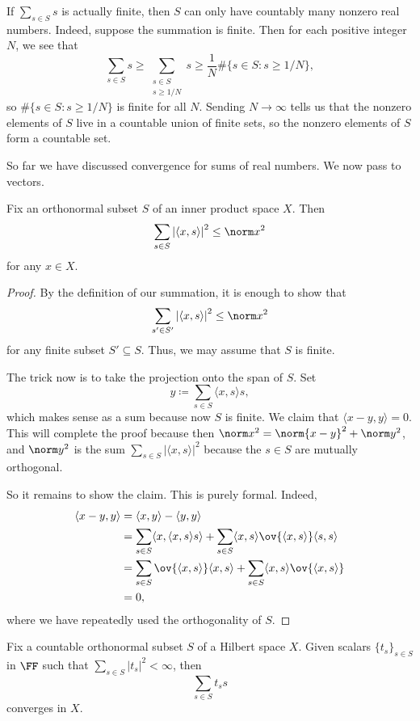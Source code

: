 \documentclass[../notes.tex]{subfiles}
\begin{document}
\begin{remark} \label{rem:converge-only-when-countable}
	If $\sum_{s\in S}s$ is actually finite, then $S$ can only have countably many nonzero real numbers. Indeed, suppose the summation is finite. Then for each positive integer $N$, we see that
	\[\sum_{s\in S}s\ge\sum_{\substack{s\in S\\s\ge1/N}}s\ge\frac1N\#\{s\in S:s\ge1/N\},\]
	so $\#\{s\in S:s\ge1/N\}$ is finite for all $N$. Sending $N\to\infty$ tells us that the nonzero elements of $S$ live in a countable union of finite sets, so the nonzero elements of $S$ form a countable set.
\end{remark}
So far we have discussed convergence for sums of real numbers. We now pass to vectors.
\begin{proposition} \label{prop:bessel-ineq}
	Fix an orthonormal subset $S$ of an inner product space $X$. Then
	\[\sum_{s\in S}\left|\langle x,s\rangle\right|^2\le\norm x^2\]
	for any $x\in X$.
\end{proposition}
\begin{proof}
	By the definition of our summation, it is enough to show that
	\[\sum_{s'\in S'}\left|\langle x,s\rangle\right|^2\le\norm x^2\]
	for any finite subset $S'\subseteq S$. Thus, we may assume that $S$ is finite.

	The trick now is to take the projection onto the span of $S$. Set
	\[y\coloneqq\sum_{s\in S}\langle x,s\rangle s,\]
	which makes sense as a sum because now $S$ is finite. We claim that $\langle x-y,y\rangle=0$. This will complete the proof because then $\norm x^2=\norm{x-y}^2+\norm y^2$, and $\norm y^2$ is the sum $\sum_{s\in S}\left|\langle x,s\rangle\right|^2$ because the $s\in S$ are mutually orthogonal.

	So it remains to show the claim. This is purely formal. Indeed,
	\begin{align*}
		\langle x-y,y\rangle &= \langle x,y\rangle-\langle y,y\rangle \\
		&= \sum_{s\in S}\langle x,\langle x,s\rangle s\rangle+\sum_{s\in S}\langle x,s\rangle\ov{\langle x,s\rangle}\langle s,s\rangle \\
		&= \sum_{s\in S}\ov{\langle x,s\rangle}\langle x, s\rangle+\sum_{s\in S}\langle x,s\rangle\ov{\langle x,s\rangle} \\
		&= 0,
	\end{align*}
	where we have repeatedly used the orthogonality of $S$.
\end{proof}
\begin{lemma} \label{lem:converge-for-vectors}
	Fix a countable orthonormal subset $S$ of a Hilbert space $X$. Given scalars $\{t_s\}_{s\in S}$ in $\FF$ such that $\sum_{s\in S}\left|t_s\right|^2<\infty$, then
	\[\sum_{s\in S}t_ss\]
	converges in $X$.
\end{lemma}
\end{document}
